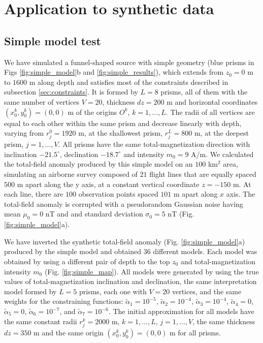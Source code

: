\section{Application to synthetic data}\label{sec:synthetic}

\subsection{Simple model test}

We have simulated a funnel-shaped source with simple geometry (blue prisms in Figs \ref{fig:simple_model}b and \ref{fig:simple_results}), which extends from $z_0=0$ m to $1600$ m along depth and satisfies most of the constraints described in subsection \ref{sec:constraints}. It is formed by $L=8$ prisms, all of them with the same number of vertices $ V = 20 $, thickness $ dz = 200 $ m and horizontal coordinates $ (x_0^k, y_0^k) = (0, 0) $ m of the origins $O^k$, $k=1,\dots,L$. The radii of all vertices are equal to each other within the same prism and decrease linearly with depth, varying from $r_j^0=1920$ m, at the shallowest prism, $r_j^L=800$ m, at the deepest prism, $j=1,\dots, V$. All prisms have the same total-magnetization direction with inclination $ -21.5^\circ $, declination $ -18.7^\circ $ and intensity $ m_0 = 9 $ A/m. We calculated the total-field anomaly produced by this simple model on an $ 100 $ km$^2$ area, simulating an airborne survey composed of $ 21 $ flight lines that are equally spaced $ 500 $ m apart along the y axis, at a constant vertical coordinate $ z = -150 $ m. At each line, there are $ 100 $ observation points spaced $101$ m apart along $ x $ axis. The total-field anomaly is corrupted with a pseudorandom Gaussian noise having mean $ \mu_0=0 $ nT and and standard deviation $ \sigma_0=5 $ nT (Fig. \ref{fig:simple_model}a).

We have inverted the synthetic total-field anomaly (Fig. \ref{fig:simple_model}a) produced by the simple model and obtained 36 different models. Each model was obtained by using a different pair of depth to the top $ z_0 $ and total-magnetization intensity $ m_0 $ (Fig. \ref{fig:simple_map}). All models were generated by using the true values of total-magnetization inclination and declination, the same interpretation model formed by $ L = 5 $ prisms, each one with $ V = 20 $ vertices, and the same weights for the constraining functions: $\tilde{\alpha}_1 = 10^{-5}$, $\tilde{\alpha}_2 = 10^{-4}$, $\tilde{\alpha}_3 = 10^{-4}$, $\tilde{\alpha}_4 = 0$, $\tilde{\alpha}_5 = 0$, $\tilde{\alpha}_6 = 10^{-7}$, and $\tilde{\alpha}_7 = 10^{-6}$. The initial approximation for all models have the same constant radii $ r^k_j = 2000 $ m, $ k = 1, \dots, L $, $ j  = 1, \dots, V $, the same thickness $ dz = 350 $ m and the same origin $(x^k_0, y^k_0) = (0, 0) $ m for all prisms.

